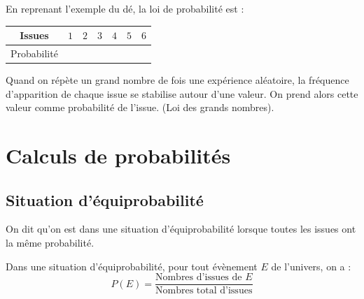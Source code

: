 \begin{Exemple}
\begin{minipage}[c]{0.5\linewidth}
En reprenant l'exemple du dé, la loi de probabilité est :
\vspace{0.2cm}

\ligne

\ligne

\ligne

\ligne

\end{minipage} \hfill
\begin{minipage}[c]{0.4\linewidth}
\renewcommand{\arraystretch}{2.5}
\begin{tabular}{|c|c|c|c|c|c|c|}
\hline
Issues & $1$ & $2$ & $3$ & $4$ & $5$ & $6$ \\
\hline
Probabilité & \phantom{$\dfrac{1}{6}$} & &  &  &  &  \\
\hline
\end{tabular}
\end{minipage}


\end{Exemple}
\vspace{0.3cm}

\begin{Remarque}
Quand on répète un grand nombre de fois une expérience aléatoire, la fréquence d'apparition de chaque issue se stabilise autour d’une valeur. On prend alors cette valeur comme probabilité de l'issue. (Loi des grands nombres).
\end{Remarque}


\vspace{0.5cm}

\section{Calculs de probabilités}
\subsection{Situation d'équiprobabilité}

\vspace{0.3cm}

\begin{Définition}
On dit qu'on est dans une situation d'équiprobabilité lorsque toutes les issues ont la même probabilité.
\end{Définition}

\vspace{0.3cm}

\begin{Propriété}
Dans une situation d'équiprobabilité, pour tout évènement $E$ de l'univers, on a : 
$$P(E)=\dfrac{\text{Nombres d'issues de }E}{\text{Nombres total d'issues}}$$
\end{Propriété}
\vspace{0.3cm}


